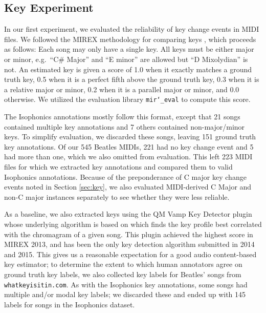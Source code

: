 \subsection{Key Experiment}

In our first experiment, we evaluated the reliability of key change events in MIDI files.
We followed the MIREX methodology for comparing keys \cite{ehmann2016mirex}, which proceeds as follows:
Each song may only have a single key.
All keys must be either major or minor, e.g.\ ``C\# Major'' and ``E minor'' are allowed but ``D Mixolydian'' is not.
An estimated key is given a score of 1.0 when it exactly matches a ground truth key, 0.5 when it is a perfect fifth above the ground truth key, 0.3 when it is a relative major or minor, 0.2 when it is a parallel major or minor, and 0.0 otherwise.
We utilized the evaluation library \texttt{mir\char`_eval} \cite{raffel2014mir_eval} to compute this score.

The Isophonics annotations mostly follow this format, except that 21 songs contained multiple key annotations and 7 others contained non-major/minor keys.
To simplify evaluation, we discarded these songs, leaving 151 ground truth key annotations.
Of our 545 Beatles MIDIs, 221 had no key change event and 5 had more than one, which we also omitted from evaluation.
This left 223 MIDI files for which we extracted key annotations and compared them to valid Isophonics annotations.
Because of the preponderance of C major key change events noted in Section \ref{sec:key}, we also evaluated MIDI-derived C Major and non-C major instances separately to see whether they were less reliable.

As a baseline, we also extracted keys using the QM Vamp Key Detector plugin \cite{cannam2015mirex} whose underlying algorithm is based on \cite{noland2007signal} which finds the key profile best correlated with the chromagram of a given song.
This plugin achieved the highest score in MIREX 2013, and has been the only key detection algorithm submitted in 2014 and 2015.
This gives us a reasonable expectation for a good audio content-based key estimator; to determine the extent to which human annotators agree on ground truth key labels, we also collected key labels for Beatles' songs from \texttt{whatkeyisitin.com}.
As with the Isophonics key annotations, some songs had multiple and/or modal key labels; we discarded these and ended up with 145 labels for songs in the Isophonics dataset.


